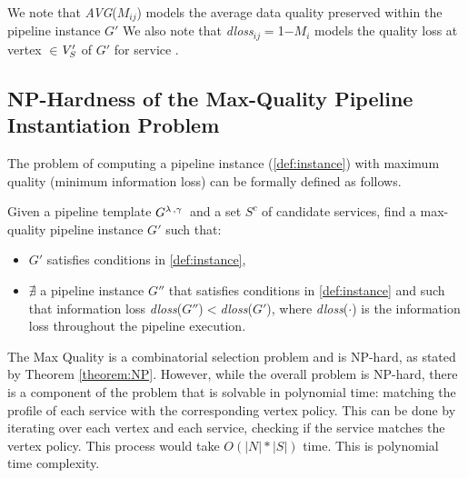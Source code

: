 We note that \emph{AVG}($M_{ij}$) models the average data quality preserved within the pipeline instance $G'$
We also note that \textit{dloss}$_{ij}$$=$1$-$$M_i$ models the quality loss at vertex $\in$$V'_S$ of $G'$ for service .

\subsection{NP-Hardness of the Max-Quality Pipeline Instantiation Problem}\label{sec:nphard}
The problem of computing a pipeline instance (\cref{def:instance}) with maximum quality (minimum information loss) can be formally defined as follows.

\begin{definition}\label{def:MaXQualityInstance}
  Given a pipeline template $G^{\lambda\,,\gamma\,}$ and a set $S^c$ of candidate services, find a max-quality pipeline instance $G'$ such that:
  \begin{itemize}
    \item $G'$ satisfies conditions in \cref{def:instance},
    \item $\nexists$ a pipeline instance $G''$ that satisfies conditions in \cref{def:instance} and such that information loss \textit{dloss}($G''$)$<$\textit{dloss}($G'$), where \textit{dloss}($\cdot$) is the information loss throughout the pipeline execution.
  \end{itemize}
\end{definition}

The Max Quality \problem is a combinatorial selection problem and is NP-hard, as stated by Theorem \cref{theorem:NP}. However, while the overall problem is NP-hard, there is a component of the problem that is solvable in polynomial time: matching the profile of each service with the corresponding vertex policy. This can be done by iterating over each vertex and each service, checking if the service matches the vertex policy. This process would take $O(|N|*|S|)$ time. This is polynomial time complexity.

